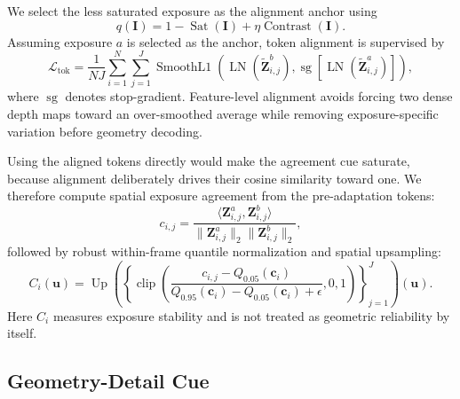 We select the less saturated exposure as the alignment anchor using
\begin{equation}
    q(\bm{I})=
    1-\operatorname{Sat}(\bm{I})
    +\eta\operatorname{Contrast}(\bm{I}).
    \label{eq:anchor_quality}
\end{equation}
Assuming exposure $a$ is selected as the anchor, token alignment is supervised
by
\begin{equation}
    \mathcal{L}_{\mathrm{tok}}=
    \frac{1}{NJ}\sum_{i=1}^{N}\sum_{j=1}^{J}
    \operatorname{SmoothL1}\!\left(
    \operatorname{LN}(\widetilde{\bm{Z}}_{i,j}^{b}),
    \operatorname{sg}\!\left[
    \operatorname{LN}(\widetilde{\bm{Z}}_{i,j}^{a})
    \right]\right),
    \label{eq:token_alignment_loss}
\end{equation}
where $\operatorname{sg}$ denotes stop-gradient. Feature-level alignment avoids
forcing two dense depth maps toward an over-smoothed average while removing
exposure-specific variation before geometry decoding.

Using the aligned tokens directly would make the agreement cue saturate,
because alignment deliberately drives their cosine similarity toward one. We
therefore compute spatial exposure agreement from the pre-adaptation tokens:
\begin{equation}
    c_{i,j}=
    \frac{\langle
    \bm{Z}_{i,j}^{a},
    \bm{Z}_{i,j}^{b}\rangle}
    {\|\bm{Z}_{i,j}^{a}\|_2
     \|\bm{Z}_{i,j}^{b}\|_2},
\end{equation}
followed by robust within-frame quantile normalization and spatial upsampling:
\begin{equation}
    C_i(\bm{u})=
    \operatorname{Up}\!\left(
    \left\{
    \operatorname{clip}\!\left(
    \frac{c_{i,j}-Q_{0.05}(\bm c_i)}
    {Q_{0.95}(\bm c_i)-Q_{0.05}(\bm c_i)+\epsilon},0,1
    \right)
    \right\}_{j=1}^{J}
    \right)(\bm{u}).
    \label{eq:exposure_agreement}
\end{equation}
Here $C_i$ measures exposure stability and is not treated as geometric
reliability by itself.

\subsection{Geometry-Detail Cue}
\label{sec:geometry_detail}


